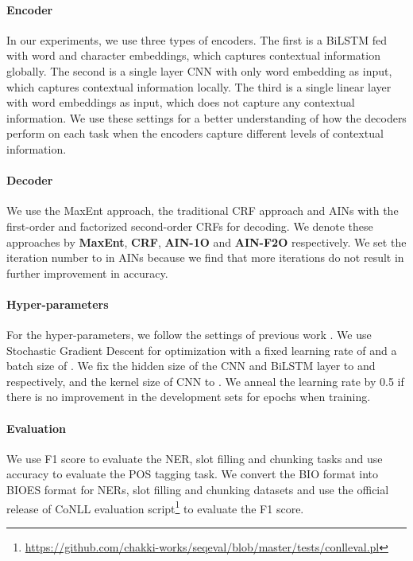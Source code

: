 \documentclass[11pt,a4paper]{article}
\begin{document}
\paragraph{Encoder}
In our experiments, we use three types of encoders. The first is a BiLSTM fed with word and character embeddings, which captures contextual information globally.
The second is a single layer CNN with only word embedding as input, which captures contextual information locally. The third is a single linear layer with word embeddings as input, which does not capture any contextual information. We use these settings for a better understanding of how the decoders perform on each task when the encoders capture different levels of contextual information. 
\paragraph{Decoder}
We use the MaxEnt approach, the traditional CRF approach and AINs with the first-order and factorized second-order CRFs for decoding. We denote these approaches by \textbf{MaxEnt}, \textbf{CRF}, \textbf{AIN-1O} and \textbf{AIN-F2O} respectively. We set the iteration number  to  in AINs because we find that more iterations do not result in further improvement in accuracy. 

\paragraph{Hyper-parameters} For the hyper-parameters, we follow the settings of previous work \cite{akbik-etal-2018-contextual}. We use Stochastic Gradient Descent for optimization with a fixed learning rate of  and a batch size of . We fix the hidden size of the CNN and BiLSTM layer to  and  respectively, and the kernel size of CNN to . We anneal the learning rate by 0.5 if there is no improvement in the development sets for  epochs when training. 

\paragraph{Evaluation} We use F1 score to evaluate the NER, slot filling and chunking tasks and use accuracy to evaluate the POS tagging task. We convert the BIO format into BIOES format for NERs, slot filling and chunking datasets and use the official release of CoNLL evaluation script\footnote{\url{https://github.com/chakki-works/seqeval/blob/master/tests/conlleval.pl}} to evaluate the F1 score.
\end{document}
